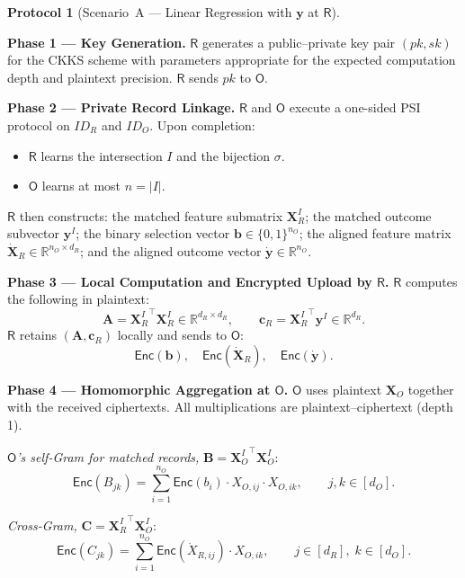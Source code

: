 \documentclass[12pt]{article}
\theoremstyle{definition}
\newtheorem{protocol}{Protocol}[section]
\theoremstyle{plain}
\newcommand{\R}{\mathbb{R}}
\newcommand{\Enc}[1]{\mathsf{Enc}\!\left(#1\right)}
\newcommand{\bXO}{\mathbf{X}_{O}}
\newcommand{\bXRI}{\mathbf{X}_{R}^{I}}
\newcommand{\bXOI}{\mathbf{X}_{O}^{I}}
\newcommand{\by}{\mathbf{y}}
\newcommand{\bb}{\mathbf{b}}
\newcommand{\bA}{\mathbf{A}}
\newcommand{\bB}{\mathbf{B}}
\newcommand{\bC}{\mathbf{C}}
\newcommand{\bcR}{\mathbf{c}_{R}}
\newcommand{\dXR}{\dot{\mathbf{X}}_{R}}
\newcommand{\dy}{\dot{\mathbf{y}}}
\newcommand{\Party}[1]{\textsf{#1}}
\newcommand{\pk}{\mathit{pk}}
\newcommand{\sk}{\mathit{sk}}
\begin{document}
\begin{protocol}[Scenario~A --- Linear Regression with $\by$ at $\Party{R}$]
\label{prot:scenA}
\hfill

\smallskip
\textbf{Phase 1 --- Key Generation.}
$\Party{R}$ generates a public--private key pair $(\pk, \sk)$ for the CKKS scheme with parameters appropriate for the expected computation depth and plaintext precision. $\Party{R}$ sends $\pk$ to $\Party{O}$.

\smallskip
\textbf{Phase 2 --- Private Record Linkage.}
$\Party{R}$ and $\Party{O}$ execute a one-sided PSI protocol on $\mathit{ID}_{R}$ and $\mathit{ID}_{O}$. Upon completion:
\begin{itemize}[noitemsep]
  \item $\Party{R}$ learns the intersection $I$ and the bijection $\sigma$.
  \item $\Party{O}$ learns at most $n = |I|$.
\end{itemize}
$\Party{R}$ then constructs: the matched feature submatrix $\bXRI$; the matched outcome subvector $\by^{I}$; the binary selection vector $\bb \in \{0,1\}^{n_{O}}$; the aligned feature matrix $\dXR \in \R^{n_{O} \times d_{R}}$; and the aligned outcome vector $\dy \in \R^{n_{O}}$.

\smallskip
\textbf{Phase 3 --- Local Computation and Encrypted Upload by $\Party{R}$.}
$\Party{R}$ computes the following in plaintext:
\[
  \bA = {\bXRI}^{\top}\bXRI \in \R^{d_{R} \times d_{R}}, \qquad
  \bcR = {\bXRI}^{\top}\by^{I} \in \R^{d_{R}}.
\]
$\Party{R}$ retains $(\bA, \bcR)$ locally and sends to $\Party{O}$:
\[
  \Enc{\bb}, \quad \Enc{\dXR}, \quad \Enc{\dy}.
\]

\smallskip
\textbf{Phase 4 --- Homomorphic Aggregation at $\Party{O}$.}
$\Party{O}$ uses plaintext $\bXO$ together with the received ciphertexts. All multiplications are plaintext--ciphertext (depth 1).

\emph{$\Party{O}$'s self-Gram for matched records,} $\bB = {\bXOI}^{\top}\bXOI$:
\begin{equation}
  \label{eq:B}
  \Enc{B_{jk}} = \sum_{i=1}^{n_{O}} \Enc{b_{i}} \cdot X_{O,ij} \cdot X_{O,ik},
  \qquad j,k \in [d_{O}].
\end{equation}

\emph{Cross-Gram,} $\bC = {\bXRI}^{\top}\bXOI$:
\begin{equation}
  \label{eq:C}
  \Enc{C_{jk}} = \sum_{i=1}^{n_{O}} \Enc{\dot{X}_{R,ij}} \cdot X_{O,ik},
  \qquad j \in [d_{R}],\; k \in [d_{O}].
\end{equation}


\end{protocol}
\end{document}
